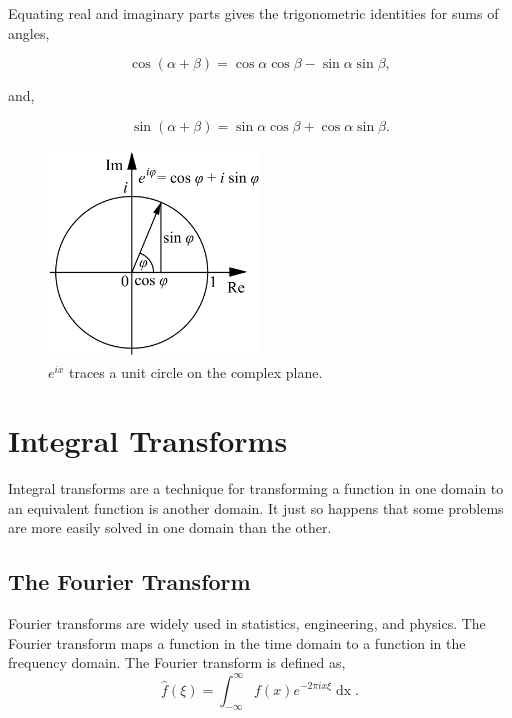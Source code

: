 \documentclass[11pt]{amsart}
\begin{document}
Equating real and imaginary parts gives the trigonometric identities for sums of angles,

$$\cos (\alpha + \beta) = \cos\alpha\cos\beta - \sin\alpha\sin\beta,$$

and,

$$\sin (\alpha + \beta) = \sin\alpha\cos\beta + \cos\alpha\sin\beta.$$

\begin{figure}[!ht]
\centering
\includegraphics[width=0.5\textwidth]{Figures/eulersformula.png}
\caption{$e^{ix}$ traces a unit circle on the complex plane.\cite{eulerformula}}
\label{fig:eulersformula}
\end{figure}

\section{Integral Transforms}

Integral transforms are a technique for transforming a function in one domain to an equivalent function is another domain. It just so happens that some problems are more easily solved in one domain than the other.

%

\subsection{The Fourier Transform}

Fourier transforms are widely used in statistics, engineering, and physics. The Fourier transform maps a function in the time domain to a function in the frequency domain. The Fourier transform is defined as,
$$\hat{f}(\xi) = \int_{-\infty}^{\infty}f(x)e^{-2\pi ix\xi}\mathop{dx}.$$
\end{document}

